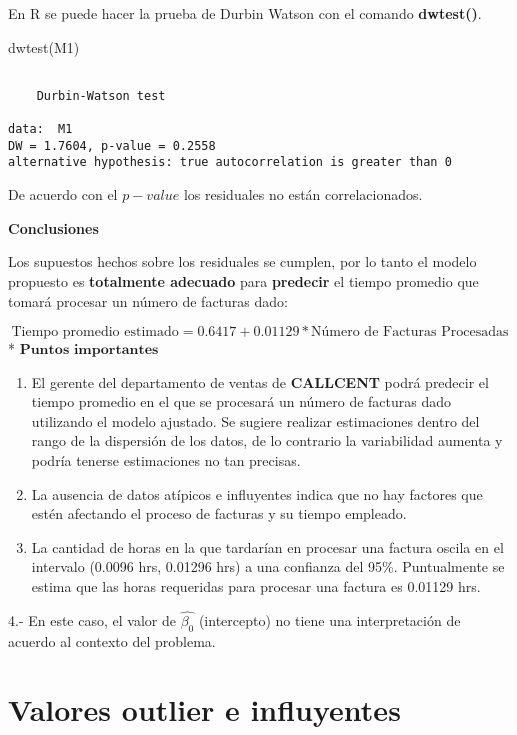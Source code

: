 \documentclass[
  a4paper,
  oneside,
  openany]{book}
\newenvironment{Shaded}{\begin{snugshade}}{\end{snugshade}}
\newcommand{\FunctionTok}[1]{\textcolor[rgb]{0.00,0.00,0.00}{#1}}
\newcommand{\NormalTok}[1]{#1}
\begin{document}
En R se puede hacer la prueba de Durbin Watson con el comando \textbf{dwtest()}.

\begin{Shaded}
\begin{Highlighting}[]
\FunctionTok{dwtest}\NormalTok{(M1)}
\end{Highlighting}
\end{Shaded}

\begin{verbatim}

    Durbin-Watson test

data:  M1
DW = 1.7604, p-value = 0.2558
alternative hypothesis: true autocorrelation is greater than 0
\end{verbatim}

De acuerdo con el \(p-value\) los residuales no están correlacionados.

\textbf{Conclusiones}

Los supuestos hechos sobre los residuales se cumplen, por lo tanto el modelo propuesto es \textbf{totalmente adecuado} para \textbf{predecir} el tiempo promedio que tomará procesar un número de facturas dado:

\[\mbox{Tiempo promedio estimado}=0.6417+0.01129* \mbox{Número de Facturas Procesadas} \]
* \(\textbf{Puntos importantes}\)

\begin{enumerate}
\def\labelenumi{\arabic{enumi}.}
\item
  El gerente del departamento de ventas de \textbf{CALLCENT} podrá predecir el tiempo promedio en el que se procesará un número de facturas dado utilizando el modelo ajustado. Se sugiere realizar estimaciones dentro del rango de la dispersión de los datos, de lo contrario la variabilidad aumenta y podría tenerse estimaciones no tan precisas.
\item
  La ausencia de datos atípicos e influyentes indica que no hay factores que estén afectando el proceso de facturas y su tiempo empleado.
\item
  La cantidad de horas en la que tardarían en procesar una factura oscila en el intervalo (0.0096 hrs, 0.01296 hrs) a una confianza del 95\%. Puntualmente se estima que las horas requeridas para procesar una factura es 0.01129 hrs.
\end{enumerate}

4.- En este caso, el valor de \(\hat{\beta_{0}}\) (intercepto) no tiene una interpretación de acuerdo al contexto del problema.

\hypertarget{valores-outlier-e-influyentes}{%
\section{Valores outlier e influyentes}\label{valores-outlier-e-influyentes}}
\end{document}
